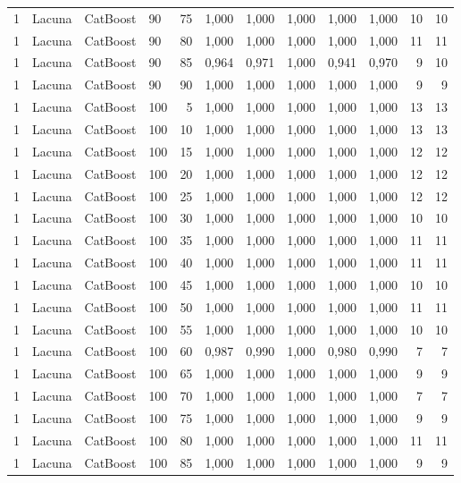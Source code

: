 \begin{longtable}{ccclrrrrrrrr}
1 & Lacuna & CatBoost & 90 & 75 & 1,000 & 1,000 & 1,000 & 1,000 & 1,000 & 10 & 10 \\
1 & Lacuna & CatBoost & 90 & 80 & 1,000 & 1,000 & 1,000 & 1,000 & 1,000 & 11 & 11 \\
1 & Lacuna & CatBoost & 90 & 85 & 0,964 & 0,971 & 1,000 & 0,941 & 0,970 & 9 & 10 \\
1 & Lacuna & CatBoost & 90 & 90 & 1,000 & 1,000 & 1,000 & 1,000 & 1,000 & 9 & 9 \\
1 & Lacuna & CatBoost & 100 & 5 & 1,000 & 1,000 & 1,000 & 1,000 & 1,000 & 13 & 13 \\
1 & Lacuna & CatBoost & 100 & 10 & 1,000 & 1,000 & 1,000 & 1,000 & 1,000 & 13 & 13 \\
1 & Lacuna & CatBoost & 100 & 15 & 1,000 & 1,000 & 1,000 & 1,000 & 1,000 & 12 & 12 \\
1 & Lacuna & CatBoost & 100 & 20 & 1,000 & 1,000 & 1,000 & 1,000 & 1,000 & 12 & 12 \\
1 & Lacuna & CatBoost & 100 & 25 & 1,000 & 1,000 & 1,000 & 1,000 & 1,000 & 12 & 12 \\
1 & Lacuna & CatBoost & 100 & 30 & 1,000 & 1,000 & 1,000 & 1,000 & 1,000 & 10 & 10 \\
1 & Lacuna & CatBoost & 100 & 35 & 1,000 & 1,000 & 1,000 & 1,000 & 1,000 & 11 & 11 \\
1 & Lacuna & CatBoost & 100 & 40 & 1,000 & 1,000 & 1,000 & 1,000 & 1,000 & 11 & 11 \\
1 & Lacuna & CatBoost & 100 & 45 & 1,000 & 1,000 & 1,000 & 1,000 & 1,000 & 10 & 10 \\
1 & Lacuna & CatBoost & 100 & 50 & 1,000 & 1,000 & 1,000 & 1,000 & 1,000 & 11 & 11 \\
1 & Lacuna & CatBoost & 100 & 55 & 1,000 & 1,000 & 1,000 & 1,000 & 1,000 & 10 & 10 \\
1 & Lacuna & CatBoost & 100 & 60 & 0,987 & 0,990 & 1,000 & 0,980 & 0,990 & 7 & 7 \\
1 & Lacuna & CatBoost & 100 & 65 & 1,000 & 1,000 & 1,000 & 1,000 & 1,000 & 9 & 9 \\
1 & Lacuna & CatBoost & 100 & 70 & 1,000 & 1,000 & 1,000 & 1,000 & 1,000 & 7 & 7 \\
1 & Lacuna & CatBoost & 100 & 75 & 1,000 & 1,000 & 1,000 & 1,000 & 1,000 & 9 & 9 \\
1 & Lacuna & CatBoost & 100 & 80 & 1,000 & 1,000 & 1,000 & 1,000 & 1,000 & 11 & 11 \\
1 & Lacuna & CatBoost & 100 & 85 & 1,000 & 1,000 & 1,000 & 1,000 & 1,000 & 9 & 9 \\

\end{longtable}

